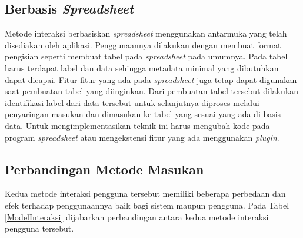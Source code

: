 	\subsection{Berbasis \textit{Spreadsheet}}
	Metode interaksi berbasiskan \textit{spreadsheet} menggunakan antarmuka yang telah disediakan oleh aplikasi. Penggunaannya dilakukan dengan membuat format pengisian seperti membuat tabel pada \textit{spreadsheet} pada umumnya. Pada tabel harus terdapat label dan data sehingga metadata minimal yang dibutuhkan dapat dicapai. Fitur-fitur yang ada pada \textit{spreadsheet} juga tetap dapat digunakan saat pembuatan tabel yang diinginkan. Dari pembuatan tabel tersebut dilakukan identifikasi label dari data tersebut untuk selanjutnya diproses melalui penyaringan masukan dan dimasukan ke tabel yang sesuai yang ada di basis data. Untuk mengimplementasikan teknik ini harus mengubah kode pada program \textit{spreadsheet} atau mengekstensi fitur yang ada menggunakan \textit{plugin}. 

	\subsection{Perbandingan Metode Masukan}
	Kedua metode interaksi pengguna tersebut memiliki beberapa perbedaan dan efek terhadap penggunaannya baik bagi sistem maupun pengguna. Pada Tabel \ref{ModelInteraksi} dijabarkan perbandingan antara kedua metode interaksi pengguna tersebut.

